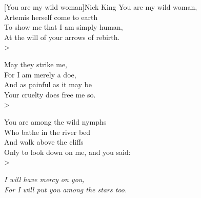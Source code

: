 
\begin{poetry}{[You are my wild woman]}{Nick King}
You are my wild woman,\\
Artemis herself come to earth\\
To show me that I am simply human,\\
At the will of your arrows of rebirth.\\>

May they strike me,\\
For I am merely a doe,\\
And as painful as it may be\\
Your cruelty does free me so.\\>

You are among the wild nymphs\\
Who bathe in the river bed\\
And walk above the cliffs\\
Only to look down on me, and you said:\\>

\textit{I will have mercy on you,}\\
\textit{For I will put you among the stars too.}
\end{poetry}

